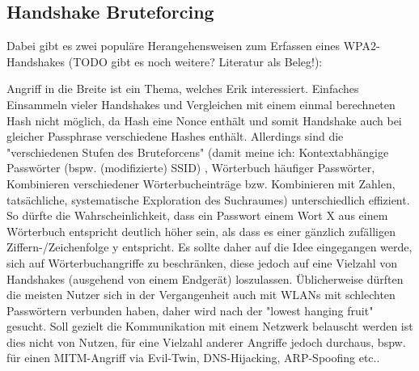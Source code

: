 \subsection{Handshake Bruteforcing}
Dabei gibt es zwei populäre Herangehensweisen zum Erfassen eines WPA2-Handshakes (TODO gibt es noch weitere? Literatur als Beleg!): 

Angriff in die Breite ist ein Thema, welches Erik interessiert. Einfaches Einsammeln vieler Handshakes und Vergleichen mit einem einmal berechneten Hash nicht möglich, da Hash eine Nonce enthält und somit Handshake auch bei gleicher Passphrase verschiedene Hashes enthält. Allerdings sind die "verschiedenen Stufen des Bruteforcens" (damit meine ich: Kontextabhängige Passwörter (bspw. (modifizierte) SSID) , Wörterbuch häufiger Passwörter, Kombinieren verschiedener Wörterbucheinträge bzw. Kombinieren mit Zahlen, tatsächliche, systematische Exploration des Suchraumes) unterschiedlich effizient. So dürfte die Wahrscheinlichkeit, dass ein Passwort einem Wort X aus einem Wörterbuch entspricht deutlich höher sein, als dass es einer gänzlich zufälligen Ziffern-/Zeichenfolge y entspricht. Es sollte daher auf die Idee eingegangen werde, sich auf Wörterbuchangriffe zu beschränken, diese jedoch auf eine Vielzahl von Handshakes (ausgehend von einem Endgerät) loszulassen. Üblicherweise dürften die meisten Nutzer sich in der Vergangenheit auch mit WLANs mit schlechten Passwörtern verbunden haben, daher wird nach der "lowest hanging fruit" gesucht. Soll gezielt die Kommunikation mit einem Netzwerk belauscht werden ist dies nicht von Nutzen, für eine Vielzahl anderer Angriffe jedoch durchaus, bspw. für einen MITM-Angriff via Evil-Twin, DNS-Hijacking, ARP-Spoofing etc..